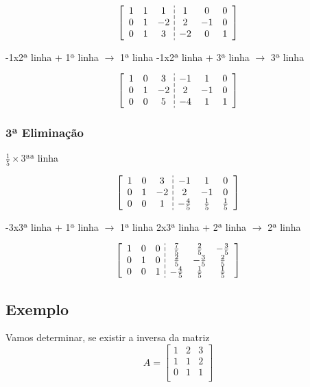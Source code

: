 \documentclass{article}
\begin{document}
$$
  \setlength{\dashlinegap}{2pt}
\left[\begin{array}{ccc:ccc}
  1 & 1 & 1 & 1 & 0 & 0 \\
  0 & 1 & -2 & 2 & -1 & 0 \\
  0 & 1 & 3 & -2 & 0 & 1 \\
  \end{array}
\right]
$$

-1x2ª linha + 1ª linha $\longrightarrow $ 1ª linha \newline
-1x2ª linha + 3ª linha $\longrightarrow $ 3ª linha \newline

$$
\setlength{\dashlinegap}{2pt}
\left[\begin{array}{ccc:ccc}
  1 & 0 & 3 & -1 & 1 & 0 \\
  0 & 1 & -2 & 2 & -1 & 0 \\
  0 & 0 & 5 & -4 & 1 & 1 \\
  \end{array}
\right]
$$

\subsubsection*{3ª Eliminação}

$\frac{1}{5} \times 3ª$ª linha

$$
  \setlength{\dashlinegap}{2pt}
\left[\begin{array}{ccc:ccc}
  1 & 0 & 3 & -1 & 1 & 0 \\
  0 & 1 & -2 & 2 & -1 & 0 \\
  0 & 0 & 1 & -\frac{4}{5} & \frac{1}{5} & \frac{1}{5} \\
  \end{array}
\right]
$$

-3x3ª linha + 1ª linha $\longrightarrow $ 1ª linha \newline
2x3ª linha + 2ª linha $\longrightarrow $ 2ª linha \newline

$$
  \setlength{\dashlinegap}{2pt}
\left[\begin{array}{ccc:ccc}
  1 & 0 & 0 & \frac{7}{5} & \frac{2}{5}  & -\frac{3}{5}  \\
  0 & 1 & 0 & \frac{2}{5}  & -\frac{3}{5}  & \frac{2}{5}  \\
  0 & 0 & 1 & -\frac{4}{5} & \frac{1}{5} & \frac{1}{5} \\
  \end{array}
\right]
$$

\subsection{Exemplo}
Vamos determinar, se existir a inversa da matriz
$$A = 
\begin{bmatrix}
  1 & 2 & 3 \\
  1 & 1 & 2 \\
  0 & 1 & 1 \\
\end{bmatrix}$$
\end{document}
